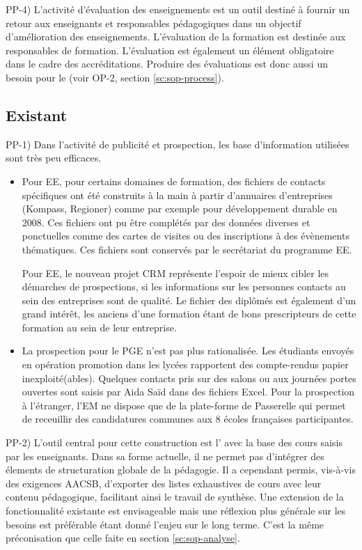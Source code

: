 \documentclass{book}
\begin{document}
PP-4) L'activité d'évaluation des enseignements est un outil destiné à fournir un 
retour aux enseignants et responsables pédagogiques dans un objectif d'amélioration
des enseignements. L'évaluation de la formation est destinée aux responsables de
formation.
L'évaluation est également  un élément obligatoire dans le cadre des accréditations. 
Produire des évaluations est donc aussi un besoin pour le \sop (voir OP-2, 
section \ref{sc:sop-process}). 


\subsection{Existant}

PP-1) Dans l'activité de publicité et prospection, les base d'information 
utilisées sont très peu efficaces. 
\begin{itemize}
\item Pour EE, pour certains domaines de formation, des fichiers de contacts 
spécifiques ont été construits à la main à partir d'annuaires d'entreprises 
(Kompass,  Regioner) comme par exemple pour développement durable en
2008. Ces fichiers ont pu être complétés par des données diverses et ponctuelles
comme des cartes de visites ou des inscriptions à des évènements thématiques.
Ces fichiers sont conservés par le secrétariat du programme EE.

Pour EE, le nouveau projet CRM représente l'espoir de mieux cibler les
démarches de prospections, si les informations sur les personnes contacts au sein 
des entreprises sont de qualité. Le fichier des diplômés est également d'un 
grand intérêt, les anciens d'une formation étant de bons prescripteurs de cette 
formation au sein de leur entreprise.

\item
La prospection pour le PGE n'est pas plus rationalisée. Les étudiants envoyés
en opération promotion dans les lycées rapportent des compte-rendus papier
inexploité(ables). Quelques contacts pris sur des salons ou aux journées portes
ouvertes sont saisis par Aida Saïd dans des fichiers Excel. Pour la prospection
à l'étranger, l'EM ne dispose que de la plate-forme  de Passerelle
qui permet de receuillir des candidatures communes aux 8 écoles françaises 
participantes. \\
\end{itemize}


PP-2) L'outil central pour cette construction est l' avec 
la base des cours saisis par les enseignants. Dans sa forme actuelle, il 
ne permet pas d'intégrer des élements de structuration globale de la pédagogie. 
Il a cependant permis, vis-à-vis des exigences AACSB, d'exporter des listes 
exhaustives de cours avec leur contenu pédagogique, facilitant ainsi le
travail de synthèse. Une extension de la fonctionnalité existante est 
envisageable mais une réflexion plus générale sur les besoins est préférable 
étant donné l'enjeu sur le long terme. C'est la même préconisation que celle 
faite en section \ref{sc:sop-analyse}.
\end{document}
